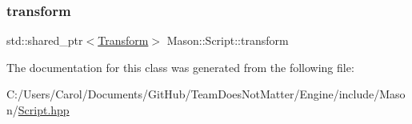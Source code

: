\subsubsection{\texorpdfstring{transform}{transform}}
{\footnotesize\ttfamily std\+::shared\+\_\+ptr$<$\hyperlink{class_mason_1_1_transform}{Transform}$>$ Mason\+::\+Script\+::transform}



The documentation for this class was generated from the following file\+:\begin{DoxyCompactItemize}
\item 
C\+:/\+Users/\+Carol/\+Documents/\+Git\+Hub/\+Team\+Does\+Not\+Matter/\+Engine/include/\+Mason/\hyperlink{_script_8hpp}{Script.\+hpp}\end{DoxyCompactItemize}
